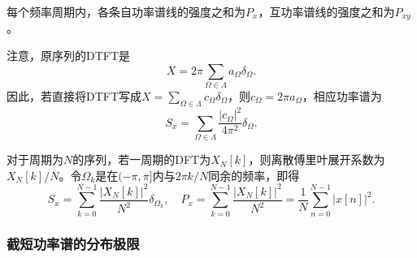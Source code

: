 每个频率周期内，各条自功率谱线的强度之和为$P_x$，互功率谱线的强度之和为$P_{xy}$。

注意，原序列的DTFT是
\begin{equation}
    X=2\pi\sum_{\Omega\in\Lambda}a_\Omega\delta_\Omega.
\end{equation}
因此，若直接将DTFT写成$X=\sum_{\Omega\in\Lambda}c_\Omega\delta_\Omega$，则$c_\Omega=2\pi a_\Omega$，相应功率谱为
\begin{equation}
    S_x=\sum_{\Omega\in\Lambda}\frac{|c_\Omega|^2}{4\pi^2}\delta_\Omega.
\end{equation}

对于周期为$N$的序列，若一周期的DFT为$X_N[k]$，则离散傅里叶展开系数为$X_N[k]/N$。令$\Omega_k$是在$(-\pi,\pi]$内与$2\pi k/N$同余的频率，即得
\begin{equation}
    S_x=\sum_{k=0}^{N-1}\frac{|X_N[k]|^2}{N^2}\delta_{\Omega_k},\quad
    P_x=\sum_{k=0}^{N-1}\frac{|X_N[k]|^2}{N^2}=\frac{1}{N}\sum_{n=0}^{N-1}|x[n]|^2.
\end{equation}

\subsubsection{截短功率谱的分布极限}

